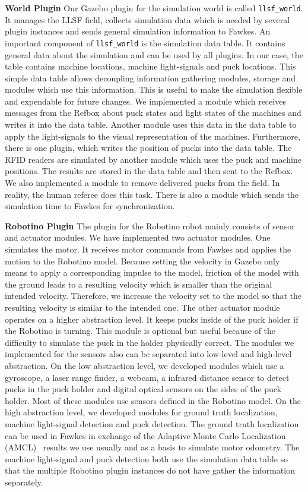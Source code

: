 \textbf{World Plugin}
Our Gazebo plugin for the simulation world is called \texttt{llsf\_world}. It manages the LLSF field, collects simulation data which is needed by several plugin instances and sends general simulation information to Fawkes. An important component of \texttt{llsf\_world} is the simulation data table. It contains general data about the simulation and can be used by all plugins. In our case, the table contains machine locations, machine light-signals and puck locations. This simple data table allows decoupling information gathering modules, storage and modules which use this information. This is useful to make the simulation flexible and expendable for future changes. We implemented a module which receives messages from the Refbox about puck states and light states of the machines and writes it into the data table. Another module uses this data in the data table to apply the light-signals to the visual representation of the machines. Furthermore, there is one plugin, which writes the position of pucks into the data table. The RFID readers are simulated by another module which uses the puck and machine positions. The results are stored in the data table and then sent to the Refbox. We also implemented a module to remove delivered pucks from the field. In reality, the human referee does this task. There is also a module which sends the simulation time to Fawkes for synchronization.

\textbf{Robotino Plugin}
The plugin for the Robotino robot mainly consists of sensor and actuator modules. We have implemented two actuator modules. One simulates the motor. It receives motor commands from Fawkes and applies the motion to the Robotino model. Because setting the velocity in Gazebo only means to apply a corresponding impulse to the model, friction of the model with the ground leads to a resulting velocity which is smaller than the original intended velocity. Therefore, we increase the velocity set to the model so that the resulting velocity is similar to the intended one. The other actuator module operates on a higher abstraction level. It keeps pucks inside of the puck holder if the Robotino is turning. This module is optional but useful because of the difficulty to simulate the puck in the holder physically correct. The modules we implemented for the sensors also can be separated into low-level and high-level abstraction. On the low abstraction level, we developed modules which use a gyroscope, a laser range finder, a webcam, a infrared distance sensor to detect pucks in the puck holder and digital optical sensors on the sides of the puck holder. Most of these modules use sensors defined in the Robotino model. On the high abstraction level, we developed modules for ground truth localization, machine light-signal detection and puck detection. The ground truth localization can be used in Fawkes in exchange of the Adaptive Monte Carlo Localization (AMCL)~\cite{amcl} results we use usually and as a basis to simulate motor odometry. The machine light-signal and puck detection both use the simulation data table so that the multiple Robotino plugin instances do not have gather the information separately.


